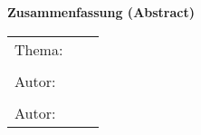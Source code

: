 
\begin{center}
{\Large \textbf{Zusammenfassung (Abstract)}}
\end{center}

\bigskip

\begin{center}
	\begin{tabular}{p{3.8cm}p{4cm}p{6cm}}
		Thema: & \multicolumn{2}{p{10cm}}{\raggedright\strTopic} \\
		 & & \\
		Autor: & \strAuthorOne & \strAuthorOneMatNr \\
		 & & \\
		Autor: & \strAuthorTwo & \strAuthorTwoMatNr \\
	\end{tabular}
\end{center}

\bigskip

\noindent

\thispagestyle{lists}


